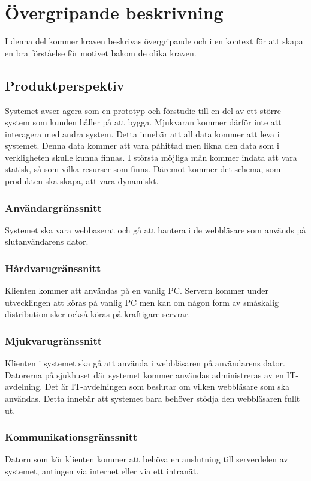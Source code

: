 \documentclass[twoside]{article}
\begin{document}
\section{Övergripande beskrivning}
\label{sec:overall}
I denna del kommer kraven beskrivas övergripande och i en kontext för att
skapa en bra förståelse för motivet bakom de olika kraven.

\subsection{Produktperspektiv}
\label{subsec:Produktperspektiv}
Systemet avser agera som en prototyp och förstudie till en del av ett större
system som kunden håller på att bygga.
Mjukvaran kommer därför inte att interagera med andra system. Detta innebär att all
data kommer att leva i systemet. Denna data kommer att vara påhittad men likna
den data som i verkligheten skulle kunna finnas.
I största möjliga mån kommer indata att vara statisk, så som vilka resurser som
finns. Däremot kommer det schema, som produkten ska skapa, att vara dynamiskt.
\subsubsection{Användargränssnitt}
\label{subsec:Anvandargranssnitt}
Systemet ska vara webbaserat och gå att hantera i de webbläsare som
används på slutanvändarens dator.
\subsubsection{Hårdvarugränssnitt}
\label{subsec:Hardvarugranssnitt}
Klienten kommer att användas på en vanlig PC. Servern kommer under utvecklingen
att köras på vanlig PC men kan om någon form av småskalig distribution sker
också köras på kraftigare servrar.
\subsubsection{Mjukvarugränssnitt}
\label{subsec:Mjukvarugranssnitt}
Klienten i systemet ska gå att använda i webbläsaren på användarens dator.
Datorerna på sjukhuset där systemet kommer användas administreras av en
IT-avdelning. Det är IT-avdelningen som beslutar om vilken webbläsare som ska
användas. Detta innebär att systemet bara behöver stödja den webbläsaren fullt
ut.
\subsubsection{Kommunikationsgränssnitt}
\label{subsec:Kommunikationsgranssnitt}
Datorn som kör klienten kommer att behöva en
anslutning till serverdelen av systemet, antingen via internet eller via ett
intranät.
\end{document}
